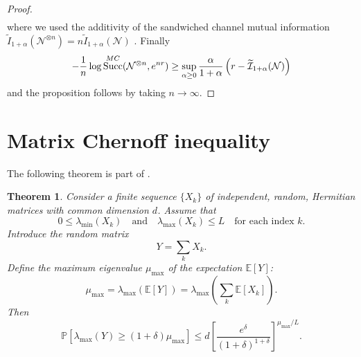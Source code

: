 \documentclass[a4paper,onecolumn,11pt,accepted=2025-10-01]{quantumarticle}
\newtheorem{theorem}{Theorem}
\DeclareMathOperator{\suc}{Succ}
\newcommand*{\cI}{\mathcal{I}}
\newcommand*{\cN}{\mathcal{N}}
\newcommand*{\pr}[1]{\mathbb{P}\left[#1 \right]}
\newcommand*{\ex}[1]{\mathbb{E}\left[#1 \right]}
\begin{document}
\begin{proof}
\begin{align}
\end{align}
where we used the additivity of the sandwiched channel mutual information $\widetilde{I}_{1+\alpha}\left(\cN^{\otimes n}\right) = n\widetilde{I}_{1+\alpha}\left(\cN\right)$ \cite{Gupta2015Mar}. Finally 
\begin{align}
     - \frac{1}{n}\log \suc^{\rm{MC}}(\cN^{\otimes n}, e^{nr})  \ge \sup_{\alpha\ge 0}  \frac{\alpha}{1+\alpha}\left( r- \widetilde{\cI}_{1+\alpha}(\cN) \right) 
\end{align}
and the proposition follows by taking $n\rightarrow \infty$. 
\end{proof}


\section{Matrix Chernoff inequality}\label{sec:rdm-matrix}

The following theorem is part of  \cite[Theorem 5.1.1]{Tropp2015May}.

\begin{theorem}\label{thm:rdm-matrix}
    Consider a finite sequence $\{X_k\}$ of independent, random, Hermitian matrices with common dimension $d$. Assume that 
    \[
        0\le \lambda_{\min}(X_k) \quad \text{and} \quad \lambda_{\max}(X_k)\le L \quad \text{for each index }  k.\]
    Introduce the random matrix 
    \[        Y=\sum_k X_k.\]
Define the   maximum eigenvalue $\mu_{\max}$ of the expectation $\ex{Y}$:
\[\mu_{\max} = \lambda_{\max}(\ex{Y}) = \lambda_{\max}\left(\sum_k \ex{X_k} \right).\] 
Then 
\[\pr{\lambda_{\max}(Y)\ge (1+\delta)\mu_{\max}} \le d\left[\frac{e^{\delta}}{(1+\delta)^{1+\delta}}\right]^{\mu_{\max}/L}.\]
\end{theorem}

\end{document}
